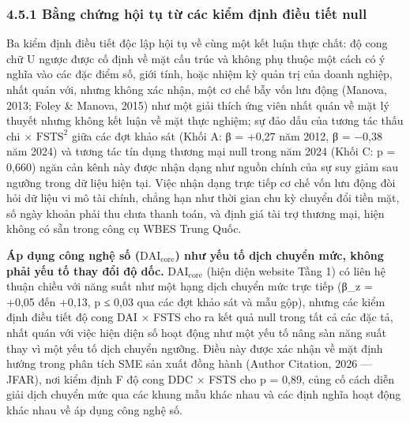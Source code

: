 \documentclass[12pt,a4paper]{article}
\begin{document}
\hypertarget{451-bux1eb1ng-chux1ee9ng-hux1ed9i-tux1ee5-tux1eeb-cuxe1c-kiux1ec3m-ux111ux1ecbnh-ux111iux1ec1u-tiux1ebft-null}{%
\subsubsection{4.5.1 Bằng chứng hội tụ từ các kiểm định điều tiết
null}\label{451-bux1eb1ng-chux1ee9ng-hux1ed9i-tux1ee5-tux1eeb-cuxe1c-kiux1ec3m-ux111ux1ecbnh-ux111iux1ec1u-tiux1ebft-null}}

Ba kiểm định điều tiết độc lập hội tụ về cùng một kết luận thực chất: độ
cong chữ U ngược được cố định về mặt cấu trúc và không phụ thuộc một
cách có ý nghĩa vào các đặc điểm số, giới tính, hoặc nhiệm kỳ quản trị
của doanh nghiệp, nhất quán với, nhưng không xác nhận, một cơ chế bẫy
vốn lưu động (Manova, 2013; Foley \& Manova, 2015) như một giải thích
ứng viên nhất quán về mặt lý thuyết nhưng không kết luận về mặt thực
nghiệm; sự đảo dấu của tương tác thấu chi × \(\mathrm{FSTS}^2\) giữa các
đợt khảo sát (Khối A: β = +0,27 năm 2012, β = −0,38 năm 2024) và tương
tác tín dụng thương mại null trong năm 2024 (Khối C: p = 0,660) ngăn cản
kênh này được nhận dạng như nguồn chính của sự suy giảm sau ngưỡng trong
dữ liệu hiện tại. Việc nhận dạng trực tiếp cơ chế vốn lưu động đòi hỏi
dữ liệu vi mô tài chính, chẳng hạn như thời gian chu kỳ chuyển đổi tiền
mặt, số ngày khoản phải thu chưa thanh toán, và định giá tài trợ thương
mại, hiện không có sẵn trong công cụ WBES Trung Quốc.

\textbf{Áp dụng công nghệ số (\(\mathrm{DAI}_{\text{core}}\)) như yếu tố
dịch chuyển mức, không phải yếu tố thay đổi độ dốc.}
\(\mathrm{DAI}_{\text{core}}\) (hiện diện website Tầng 1) có liên hệ
thuận chiều với năng suất như một hạng dịch chuyển mức trực tiếp (β\_z =
+0,05 đến +0,13, p ≤ 0,03 qua các đợt khảo sát và mẫu gộp), nhưng các
kiểm định điều tiết độ cong DAI × FSTS cho ra kết quả null trong tất cả
các đặc tả, nhất quán với việc hiện diện số hoạt động như một yếu tố
nâng sàn năng suất thay vì một yếu tố dịch chuyển ngưỡng. Điều này được
xác nhận về mặt định hướng trong phân tích SME sản xuất đồng hành
(Author Citation, 2026 --- JFAR), nơi kiểm định F độ cong DDC × FSTS cho
p = 0,89, củng cố cách diễn giải dịch chuyển mức qua các khung mẫu khác
nhau và các định nghĩa hoạt động khác nhau về áp dụng công nghệ số.
\end{document}
